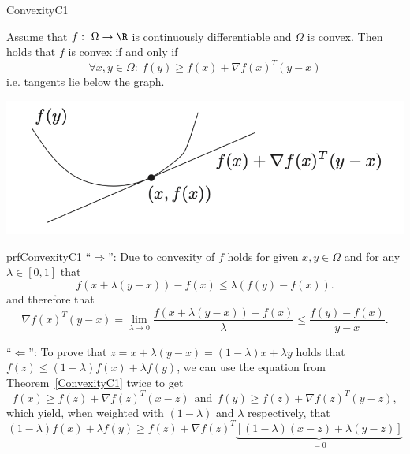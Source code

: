 \begin{theo}{ConvexityC1}
    \begin{minipage}{0.60\textwidth}
        Assume that $f: \ \Omega \rightarrow \R$ is continuously differentiable and $\Omega$ is convex. Then holds that $f$ is convex if and only if 
        \begin{equation*}
            \forall x,y \in \Omega: \ f(y) \geq f(x) + \nabla f(x)^T(y-x)
        \end{equation*}
        i\@.e\@. tangents lie below the graph.
    \end{minipage}
    \begin{minipage}{0.3\textwidth}
        \begin{center}
            \includegraphics[scale = 0.45]{Images/Fundamental/C1Convexity.png}
        \end{center}
    \end{minipage}
\end{theo}

\begin{prf}{prfConvexityC1}
    ``$\Rightarrow$'': Due to convexity of $f$ holds for given $x,y \in \Omega$  and for any $\lambda \in [0,1]$ that
    \begin{equation*}
        f(x + \lambda(y-x)) - f(x) \leq \lambda(f(y) - f(x)).
    \end{equation*}
    and therefore that 
    \begin{equation*}
        \nabla f(x)^T(y-x) 
            = \lim_{\lambda \rightarrow 0}  \frac{f(x + \lambda(y-x)) - f(x)}{\lambda}
            \leq \frac{f(y) - f(x)}{y-x}.
    \end{equation*}

    ``$\Leftarrow$'': To prove that $z = x + \lambda(y-x) = (1-\lambda)x + \lambda y$ holds that $f(z) \leq (1-\lambda)f(x) + \lambda f(y)$, we can use the equation from Theorem~\ref*{ConvexityC1} twice to get
    \begin{equation*}
        f(x) \geq f(z) + \nabla f(z)^T(x-z) \ \ \text{and} \ \ f(y) \geq f(z) + \nabla f(z)^T(y-z),
    \end{equation*}
    which yield, when weighted with $(1-\lambda)$ and $\lambda$ respectively, that
    \begin{equation*}
        (1-\lambda)f(x) + \lambda f(y) \geq f(z) + \nabla f(z)^T \underset{= 0}{\underbrace{\left[(1-\lambda)(x-z) + \lambda(y-z)\right]}}
    \end{equation*}
    \vspace{-0.75cm}
\end{prf}

